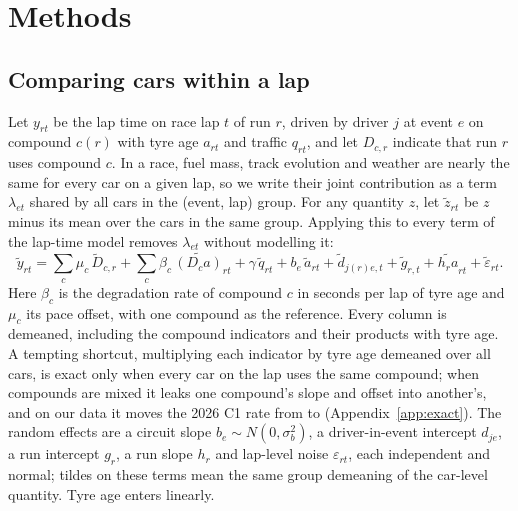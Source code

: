 \section{Methods}\label{sec:methods}

\subsection{Comparing cars within a lap}\label{sec:within}

Let $y_{rt}$ be the lap time on race lap $t$ of run $r$, driven by driver $j$ at event $e$ on compound $c(r)$ with tyre age $a_{rt}$ and traffic $q_{rt}$, and let $D_{c,r}$ indicate that run $r$ uses compound $c$.
In a race, fuel mass, track evolution and weather are nearly the same for every car on a given lap, so we write their joint contribution as a term $\lambda_{et}$ shared by all cars in the (event, lap) group.
For any quantity $z$, let $\tilde z_{rt}$ be $z$ minus its mean over the cars in the same group.
Applying this to every term of the lap-time model removes $\lambda_{et}$ without modelling it:
\begin{equation}\label{eq:race}
  \tilde y_{rt} = \sum_{c} \mu_c\,\tilde D_{c,r} + \sum_{c} \beta_{c}\,\widetilde{(D_c a)}_{rt} + \gamma\,\tilde q_{rt}
  + b_{e}\,\tilde a_{rt} + \tilde d_{j(r)e,t} + \tilde g_{r,t} + \widetilde{h_r a}_{rt} + \tilde\varepsilon_{rt}.
\end{equation}
Here $\beta_c$ is the degradation rate of compound $c$ in seconds per lap of tyre age and $\mu_c$ its pace offset, with one compound as the reference.
Every column is demeaned, including the compound indicators and their products with tyre age.
A tempting shortcut, multiplying each indicator by tyre age demeaned over all cars, is exact only when every car on the lap uses the same compound; when compounds are mixed it leaks one compound's slope and offset into another's, and on our data it moves the 2026 C1 rate from \RateCOne\spl{} to \ApproxSixRateOne\spl{} (Appendix~\ref{app:exact}).
The random effects are a circuit slope $b_e\sim N(0,\sigma_b^2)$, a driver-in-event intercept $d_{je}$, a run intercept $g_r$, a run slope $h_r$ and lap-level noise $\varepsilon_{rt}$, each independent and normal; tildes on these terms mean the same group demeaning of the car-level quantity.
Tyre age enters linearly.

